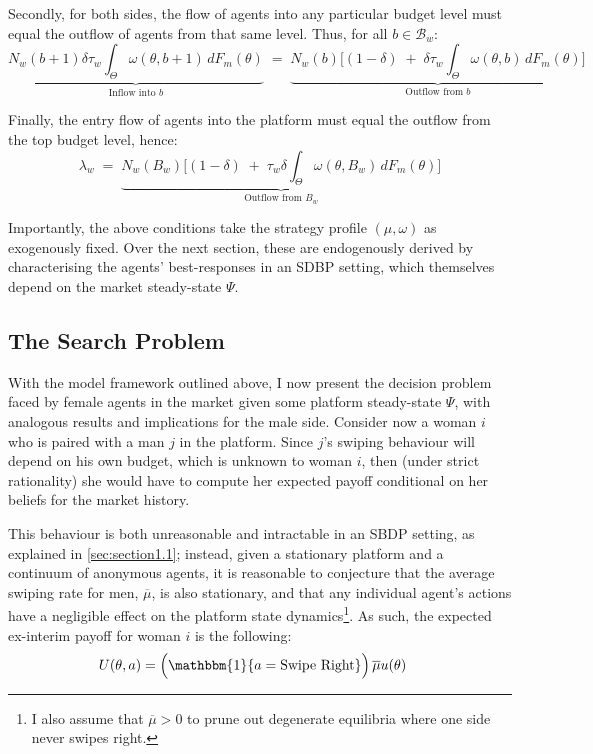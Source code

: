 Secondly, for both sides, the flow of agents into any particular budget level must equal the outflow of agents from that same level. Thus, for all $b\in\mathcal{B}_w$: 
\begin{equation}\label{eq:ss2} 
    \underbrace{N_w(b+1) \delta \tau_w \int_{\Theta} \omega(\theta,b+1)\,dF_{m}(\theta)}_{\text{Inflow into $b$}} \;=\; \underbrace{N_w(b) \Big[ (1-\delta) \;+\; \delta \tau_w\int_{\Theta} \omega(\theta,b)\,dF_{m}(\theta)\Big]}_{\text{Outflow from $b$}}
\end{equation}

Finally, the entry flow of agents into the platform must equal the outflow from the top budget level, hence: 
\begin{equation}\label{eq:ss3} 
    \lambda_w \;=\; \underbrace{N_w(B_w) \Big[ (1-\delta) \;+\; \tau_w \delta \int_{\Theta} \omega(\theta,B_w)\,dF_{m}(\theta) \Big]}_{\text{Outflow from $B_w$}}
\end{equation} 

Importantly, the above conditions take the strategy profile $(\mu,\omega)$ as exogenously fixed. Over the next section, these are endogenously derived by characterising the agents’ best-responses in an SDBP setting, which themselves depend on the market steady-state $\Psi$.

\subsection{The Search Problem}\label{sec:section2.3}
With the model framework outlined above, I now present the decision problem faced by female agents in the market given some platform steady-state $\Psi$, with analogous results and implications for the male side. 
Consider now a woman $i$ who is paired with a man $j$ in the platform. Since $j$'s swiping behaviour will depend on his own budget, which is unknown to woman $i$, then (under strict rationality) she would have to compute her expected payoff conditional on her beliefs for the market history.

This behaviour is both unreasonable and intractable in an SBDP setting, as explained in \autoref{sec:section1.1}; instead, given a stationary platform and a continuum of anonymous agents, it is reasonable to conjecture that the average swiping rate for men, $\overline\mu$, is also stationary, and that any individual agent's actions have a negligible effect on the platform state dynamics\footnote{I also assume that $\overline\mu>0$ to prune out degenerate equilibria where one side never swipes right.}.
As such, the expected ex-interim payoff for woman $i$ is the following:
\begin{equation*}
    \begin{aligned}
        U(\theta, a)&=\Big(\mathbbm{1}\{a=\text{Swipe Right}\}\Big)\,\overline{\mu}u(\theta)%
    \end{aligned} 
\end{equation*} 

